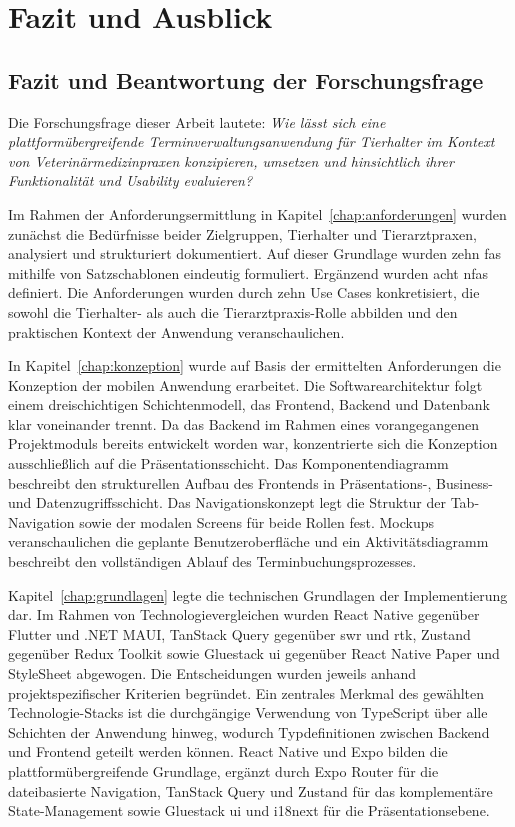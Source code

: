 \chapter{Fazit und Ausblick}
\label{chap:fazit}

\section{Fazit und Beantwortung der Forschungsfrage}
Die Forschungsfrage dieser Arbeit lautete: \textit{Wie lässt sich eine
plattformübergreifende Terminverwaltungsanwendung für Tierhalter im
Kontext von Veterinärmedizinpraxen konzipieren, umsetzen und
hinsichtlich ihrer Funktionalität und Usability evaluieren?}

Im Rahmen der Anforderungsermittlung in Kapitel~\ref{chap:anforderungen}
wurden zunächst die Bedürfnisse beider Zielgruppen, Tierhalter und
Tierarztpraxen, analysiert und strukturiert dokumentiert. Auf dieser
Grundlage wurden zehn \gls{fas} mithilfe von
Satzschablonen eindeutig formuliert. Ergänzend wurden acht \gls{nfas} definiert. Die Anforderungen wurden durch zehn Use Cases konkretisiert, die sowohl die Tierhalter- als auch die
Tierarztpraxis-Rolle abbilden und den praktischen Kontext der
Anwendung veranschaulichen.

In Kapitel~\ref{chap:konzeption} wurde auf Basis der ermittelten
Anforderungen die Konzeption der mobilen Anwendung erarbeitet. Die
Softwarearchitektur folgt einem dreischichtigen Schichtenmodell, das Frontend, Backend und Datenbank klar voneinander trennt. Da das Backend im Rahmen eines vorangegangenen Projektmoduls bereits
entwickelt worden war, konzentrierte sich die Konzeption
ausschließlich auf die Präsentationsschicht. Das Komponentendiagramm beschreibt den strukturellen Aufbau des Frontends in Präsentations-, Business- und Datenzugriffsschicht. Das Navigationskonzept legt die Struktur der Tab-Navigation sowie der modalen Screens für beide Rollen fest. Mockups veranschaulichen die geplante Benutzeroberfläche und ein Aktivitätsdiagramm beschreibt den vollständigen Ablauf des
Terminbuchungsprozesses.

Kapitel~\ref{chap:grundlagen} legte die technischen Grundlagen der
Implementierung dar. Im Rahmen von Technologievergleichen wurden
React Native gegenüber Flutter und .NET MAUI, TanStack Query
gegenüber \gls{swr} und \gls{rtk}, Zustand gegenüber Redux Toolkit
sowie Gluestack \gls{ui} gegenüber React Native Paper und StyleSheet abgewogen. Die Entscheidungen wurden jeweils anhand
projektspezifischer Kriterien begründet. Ein zentrales Merkmal des
gewählten Technologie-Stacks ist die durchgängige Verwendung von
TypeScript über alle Schichten der Anwendung hinweg, wodurch
Typdefinitionen zwischen Backend und Frontend geteilt werden können. React Native und Expo bilden die plattformübergreifende Grundlage, ergänzt durch Expo Router für die dateibasierte Navigation, TanStack Query und Zustand für das komplementäre State-Management sowie Gluestack \gls{ui} und i18next für die Präsentationsebene.

